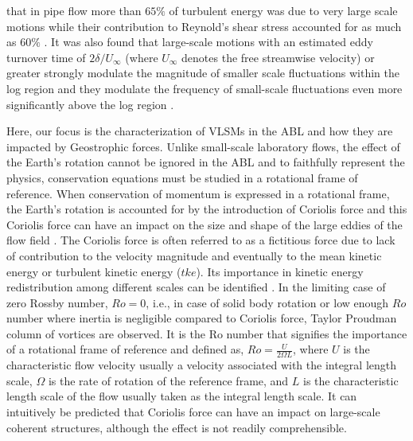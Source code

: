 that in pipe flow  more than $65\%$ of turbulent energy was due to very large scale motions while their contribution to Reynold's shear stress accounted for as much as $60\%$ \cite{guala_adrian_jfm2006}. It was also found that large-scale motions with an estimated eddy turnover time of $2\delta/U_{\infty}$ (where $U_{\infty}$ denotes the free streamwise velocity) or greater strongly modulate the magnitude of smaller scale fluctuations within the log region and they modulate the frequency of small-scale fluctuations even more significantly above the log region \cite{ganapathi_jfm_2012_modulation}. 


Here, our focus is the characterization of VLSMs in the ABL and how they are impacted by  Geostrophic forces. Unlike small-scale laboratory flows, the effect of the Earth's rotation cannot be ignored in the ABL and to faithfully represent the physics, conservation equations must be studied in a rotational frame of reference.  When conservation of momentum is expressed in a rotational frame, the Earth's rotation is accounted for by the introduction of Coriolis force and this Coriolis force can have an impact on the size and shape of the large eddies of the flow field \cite{esau_jot_2002}. The Coriolis force is often referred to as a fictitious force due to lack of contribution to the velocity magnitude and eventually to the mean kinetic energy or turbulent kinetic energy ($tke$). Its importance in kinetic energy redistribution among different scales can be identified \cite{}. In the limiting case of zero Rossby number, $Ro=0$,  i.e., in case of solid body rotation or low enough $Ro$ number where inertia is negligible compared to Coriolis force, Taylor Proudman column of vortices are observed. It is the Ro number that signifies the  importance of a rotational frame of reference and defined as,  $Ro=\frac{U}{2\Omega L}$, where $U$ is the characteristic flow velocity usually a velocity associated with the integral length scale, $\Omega$ is the rate of rotation of the reference frame, and $L$ is the characteristic length scale of the flow usually taken as the integral length scale. It can  intuitively be predicted that Coriolis force  can have an impact on large-scale coherent structures, although the effect is not readily comprehensible.   

 
